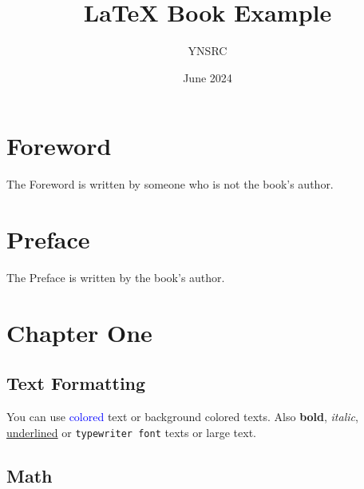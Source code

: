\documentclass[12pt, a4paper]{book}
\title{\LaTeX{} Book Example}
\author{YNSRC}
\date{June 2024}
\begin{document}
\maketitle

\frontmatter

\large

\chapter*{Foreword}
The Foreword is written by someone who is not the book's author. \blindtext[5]

\chapter*{Preface}

The Preface is written by the book's author. \blindtext[5]

\normalsize

\tableofcontents

\listoffigures
{}

\listoftables
{}

\mainmatter

\chapter{Chapter One}

\section{Text Formatting}

You can use \textcolor{blue}{colored} text or
\colorbox{BurntOrange}{background colored} texts. Also
\textbf{bold}, \textit{italic}, \underline{underlined} or
\texttt{typewriter font} texts or \large{large} text.

\normalsize

\section{Math}
\end{document}
